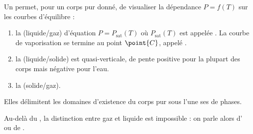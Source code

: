 \begin{definition}
Un  permet, pour un corps pur donné, de visualiser la dépendance $P = f(T)$ sur les courbes d'équilibre :

\begin{enumerate}[label=(\arabic*)]
\item la  (liquide/gaz) d'équation $P = P_{\mathrm{sat}}(T)$ où $P_{\mathrm{sat}}(T)$ est appelée . La courbe de vaporisation se termine au point $\point{C}$, appelé .
\item la  (liquide/solide) est quasi-verticale, de pente positive pour la plupart des corps mais négative pour l'eau.
\item la  (solide/gaz).
\end{enumerate}

\begin{figure}[H]
\begin{center}
\end{center}
\end{figure}

\noindent Elles délimitent les domaines d'existence du corps pur sous l'une ses de phases.
\end{definition}

\begin{remarque}
Au-delà du , la distinction entre gaz et liquide est impossible : on parle alors d' ou de .
\end{remarque}

